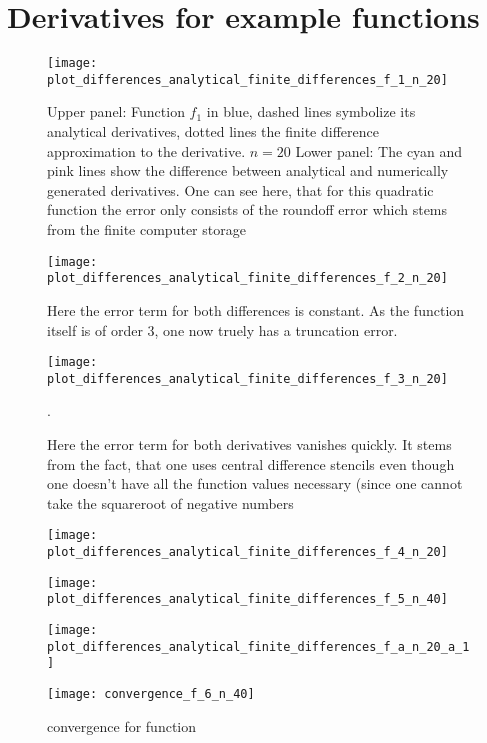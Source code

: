 \section{Derivatives for example functions}

\begin{figure}[h]
		\texttt{[image: plot\_differences\_analytical\_finite\_differences\_f\_1\_n\_20]}
		\caption{Upper panel: Function $f_1$ in blue, dashed lines symbolize its analytical derivatives, dotted lines the finite difference approximation to the derivative. $n= 20$  Lower panel: The cyan and pink lines show the difference between analytical and numerically generated derivatives.
		One can see here, that for this quadratic function the error only consists of the roundoff error which stems from the finite computer storage}
\end{figure}

\begin{figure}
		\texttt{[image: plot\_differences\_analytical\_finite\_differences\_f\_2\_n\_20]}
		\caption{ Here the error term for both differences is constant. As the function itself is of order 3, one now truely has a truncation error.}
\end{figure}

\begin{figure}
		\texttt{[image: plot\_differences\_analytical\_finite\_differences\_f\_3\_n\_20]}
	\caption{Here the error term for both derivatives vanishes quickly. It stems from the fact, that one uses central difference stencils even though one doesn't have all the function values necessary (since one cannot take the squareroot of negative numbers}.
\end{figure}

\begin{figure}
		\texttt{[image: plot\_differences\_analytical\_finite\_differences\_f\_4\_n\_20]}
		\caption{}
\end{figure}


\begin{figure}
		\texttt{[image: plot\_differences\_analytical\_finite\_differences\_f\_5\_n\_40]}
		\caption{}
\end{figure}


\begin{figure}
		\texttt{[image: plot\_differences\_analytical\_finite\_differences\_f\_a\_n\_20\_a\_1]}
		\caption{}
\end{figure}

\begin{figure}
		\texttt{[image: convergence\_f\_6\_n\_40]}
		\caption{ convergence for function }
\end{figure}
\newpage
